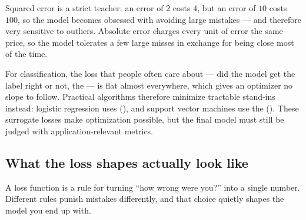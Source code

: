 \begin{intuition}
Squared error is a strict teacher: an error of $2$ costs $4$, but an error of $10$ costs $100$, so the model becomes obsessed with avoiding large mistakes --- and therefore very sensitive to outliers. Absolute error charges every unit of error the same price, so the model tolerates a few large misses in exchange for being close most of the time.
\end{intuition}

For classification, the loss that people often care about --- did the model get the label right or not, the  --- is flat almost everywhere, which gives an optimizer no slope to follow. Practical algorithms therefore minimize tractable stand-ins instead: logistic regression uses  (), and support vector machines use the  (). These surrogate losses make optimization possible, but the final model must still be judged with application-relevant metrics.

\subsection{What the loss shapes actually look like}

A loss function is a rule for turning ``how wrong were you?'' into a single number. Different rules punish mistakes differently, and that choice quietly shapes the model you end up with.

